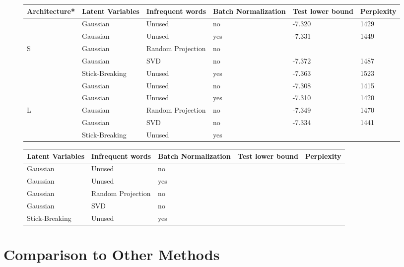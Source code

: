 \documentclass{report}
\begin{document}
	\begin{figure}
		\begin{tabular}{l l l l | l l}\label{comp_ny} 		
			Architecture* & Latent Variables & Infrequent words & Batch Normalization & Test lower bound & Perplexity  	\\ \hline
			&	Gaussian	&	Unused				&	no	&	-7.320 	& 1429 	\\ 
			&	Gaussian	&	Unused				&	yes  &	-7.331 	& 1449 	\\ 
			S	&	Gaussian	&	Random Projection	&	no	&	 	&   	\\ 
			&	Gaussian 	&	SVD					& no	&	-7.372 	& 1487	\\ 
			&	Stick-Breaking	&	Unused	&	yes &	-7.363& 1523			\\  \hline
			
			&	Gaussian	&	Unused				&	no	&	-7.308 	& 1415 	\\ 
			&	Gaussian	&	Unused				&	yes  &	 -7.310	& 1420 			\\ 
			L	&	Gaussian	&	Random Projection	&	no	&	 -7.349	&   1470	\\ 
			&	Gaussian 	&	SVD					& no	&	 -7.334	& 1441			\\ 
			&	Stick-Breaking	&	Unused	&	yes &	& 						\\  \hline
			
		\end{tabular}
	\end{figure}

	\begin{figure}
		\begin{tabular}{ l l l | l l}\label{comp_kos} 		
			  Latent Variables & Infrequent words & Batch Normalization & Test lower bound & Perplexity  	\\ \hline
				Gaussian	&	Unused				&	no	&	 	& \\ 
				Gaussian	&	Unused				&	yes  &	 	& \\ 
				Gaussian	&	Random Projection	&	no	&	 	& \\ 
				Gaussian 	&	SVD					& no	&	 	& \\ 
				Stick-Breaking	&	Unused	&	yes &	& \\  \hline
		\end{tabular}
	\end{figure}

\section{Comparison to Other Methods}
\end{document}
